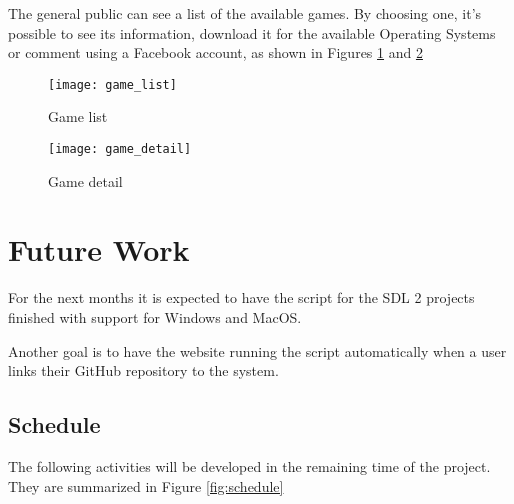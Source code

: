 The general public can see a list of the available games. By choosing one, it's possible to see its information, download it for the available Operating Systems or comment using a Facebook account, as shown in Figures \ref{fig:game_list} and \ref{fig:game_detail}

\begin{figure}[h!]
\centering
\texttt{[image: game\_list]}
\caption{Game list}
\label{fig:game_list}
\end{figure}


\begin{figure}[h!]
\centering
\texttt{[image: game\_detail]}
\caption{Game detail}
\label{fig:game_detail}
\end{figure}

\section[Future Work]{Future Work}

For the next months it is expected to have the script for the SDL 2 projects finished with support for Windows and MacOS.

Another goal is to have the website running the script automatically when a user links their GitHub repository to the system.


\subsection[Schedule]{Schedule}

The following activities will be developed in the remaining time of the project. They are summarized in Figure \ref{fig:schedule}

